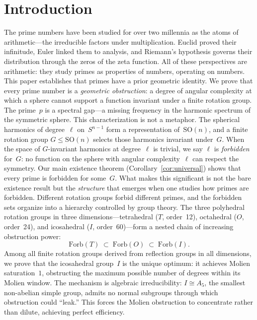 \documentclass[11pt,letterpaper]{article}
\theoremstyle{definition}
\newcommand{\Forb}{\mathrm{Forb}}
\begin{document}
\section{Introduction}\label{sec:intro}
The prime numbers have been studied for over two millennia as the atoms of arithmetic---the irreducible factors under multiplication.  Euclid proved their infinitude, Euler linked them to analysis, and Riemann's hypothesis governs their distribution through the zeros of the zeta function.  All of these perspectives are arithmetic: they study primes as properties of numbers, operating on numbers.
This paper establishes that primes have a prior geometric identity.  We prove that every prime number is a \emph{geometric obstruction}: a degree of angular complexity at which a sphere cannot support a function invariant under a finite rotation group.  The prime~$p$ is a spectral gap---a missing frequency in the harmonic spectrum of the symmetric sphere.
This characterization is not a metaphor.  The spherical harmonics of degree~$\ell$ on~$S^{n-1}$ form a representation of~$\mathrm{SO}(n)$, and a finite rotation group $G\le\mathrm{SO}(n)$ selects those harmonics invariant under~$G$.  When the space of $G$-invariant harmonics at degree~$\ell$ is trivial, we say $\ell$ is \emph{forbidden} for~$G$: no function on the sphere with angular complexity~$\ell$ can respect the symmetry.  Our main existence theorem (Corollary~\ref{cor:universal}) shows that every prime is forbidden for some~$G$.
What makes this significant is not the bare existence result but the \emph{structure} that emerges when one studies how primes are forbidden.  Different rotation groups forbid different primes, and the forbidden sets organize into a hierarchy controlled by group theory.  The three polyhedral rotation groups in three dimensions---tetrahedral ($T$, order~12), octahedral ($O$, order~24), and icosahedral ($I$, order~60)---form a nested chain of increasing obstruction power:
\[
  \Forb(T) \;\subset\; \Forb(O) \;\subset\; \Forb(I).
\]
Among all finite rotation groups derived from reflection groups in all dimensions, we prove that the icosahedral group~$I$ is the unique optimum: it achieves Molien saturation~$1$, obstructing the maximum possible number of degrees within its Molien window.  The mechanism is algebraic irreducibility: $I\cong A_5$, the smallest non-abelian simple group, admits no normal subgroups through which obstruction could ``leak.''  This forces the Molien obstruction to concentrate rather than dilute, achieving perfect efficiency.
\end{document}

